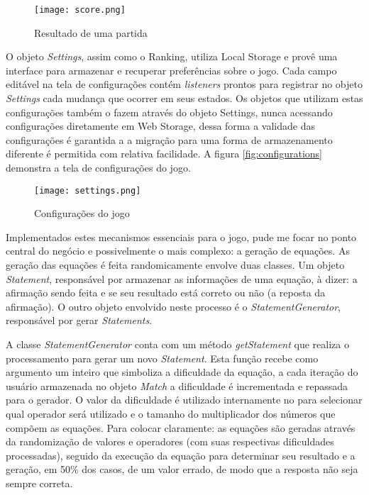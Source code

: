 \begin{figure}
    \centering
    \texttt{[image: score.png]}
	\caption{Resultado de uma partida}
    \label{fig:placar}
\end{figure}

O objeto \textit{Settings}, assim como o Ranking, utiliza Local Storage
e provê uma interface para armazenar e recuperar preferências sobre
o jogo. Cada campo editável na tela de configurações contém
\textit{listeners} prontos para registrar no objeto \textit{Settings}
cada mudança que ocorrer em seus estados. Os objetos que utilizam estas
configurações também o fazem através do objeto Settings, nunca
acessando configurações diretamente em Web Storage, dessa forma a
validade das configurações é garantida a a migração para uma forma
de armazenamento diferente é permitida com relativa facilidade.
A figura \ref{fig:configurations} demonstra a tela de configurações do 
jogo.

\begin{figure}
    \centering
    \texttt{[image: settings.png]}
	\caption{Configurações do jogo}
    \label{fig:cofigurations}
\end{figure}

Implementados estes mecanismos essenciais para o jogo, pude me
focar no ponto central do negócio e possivelmente o mais complexo:
a geração de equações. As geração das equações é feita
randomicamente envolve duas classes. Um objeto \textit{Statement},
responsável por armazenar as informações de uma equação, à dizer:
a afirmação sendo feita e se seu resultado está correto ou não (a
reposta da afirmação). O outro objeto envolvido neste processo é o
\textit{StatementGenerator}, responsável por gerar \textit{Statements}.

A classe \textit{StatementGenerator} conta com um método
\textit{getStatement} que realiza o processamento para gerar um
novo \textit{Statement}. Esta função recebe como argumento um
inteiro que simboliza a dificuldade da equação, a cada iteração
do usuário armazenada no objeto \textit{Match} a dificuldade é
incrementada e repassada para o gerador. O valor da dificuldade
é utilizado internamente no para selecionar qual operador será
utilizado e o tamanho do multiplicador dos números que compõem
as equações. Para colocar claramente: as equações são geradas
através da randomização de valores e operadores (com suas respectivas
dificuldades processadas), seguido da execução da equação para
determinar seu resultado e a geração, em 50\% dos casos, de um valor
errado, de modo que a resposta não seja sempre correta.

